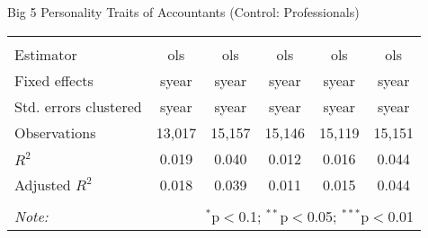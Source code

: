 \documentclass[
  9pt,
  ignorenonframetext,
]{beamer}
\begin{document}
\begin{frame}{Big 5 Personality Traits of Accountants (Control:
Professionals)}
\begin{center}
{\begin{tabular}{lccccc}
\hline \\[-1.8ex] 
Estimator & ols & ols & ols & ols & ols \\ 
Fixed effects & syear & syear & syear & syear & syear \\ 
Std. errors clustered & syear & syear & syear & syear & syear \\ 
Observations & 13,017 & 15,157 & 15,146 & 15,119 & 15,151 \\ 
$R^{2}$ & 0.019 & 0.040 & 0.012 & 0.016 & 0.044 \\ 
Adjusted $R^{2}$ & 0.018 & 0.039 & 0.011 & 0.015 & 0.044 \\ 
\hline 
\hline \\[-1.8ex] 
\textit{Note:}  & \multicolumn{5}{r}{$^{*}$p$<$0.1; $^{**}$p$<$0.05; $^{***}$p$<$0.01} \\ 
\end{tabular}}
\end{center}
\end{frame}
\end{document}

